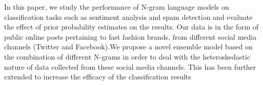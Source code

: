In this paper, we study the performance of N-gram language models on classification tasks such as sentiment analysis and spam detection and evaluate the effect of prior probability estimates on the results. Our data is in the form of public online posts pertaining to fast fashion brands, from different social media channels (Twitter and Facebook).We propose a novel ensemble model based on the combination of different N-grams in order to deal with the heteroskedastic nature of data collected from these social media channels. This has been further extended to increase the efficacy of the classification results
